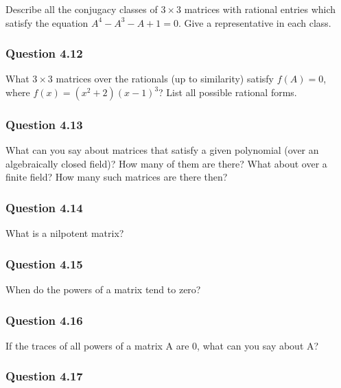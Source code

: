 Describe all the conjugacy classes of \(3 \times 3\) matrices with
rational entries which satisfy the equation \(A^4 - A^3 - A + 1 = 0\).
Give a representative in each class.

\hypertarget{question-4.12}{%
\subsubsection{Question 4.12}\label{question-4.12}}

What \(3 \times 3\) matrices over the rationals (up to similarity)
satisfy \(f (A) = 0\), where \(f (x) = (x^2 + 2)(x - 1)^3\)? List all
possible rational forms.

\hypertarget{question-4.13}{%
\subsubsection{Question 4.13}\label{question-4.13}}

What can you say about matrices that satisfy a given polynomial (over an
algebraically closed field)? How many of them are there? What about over
a finite field? How many such matrices are there then?

\hypertarget{question-4.14}{%
\subsubsection{Question 4.14}\label{question-4.14}}

What is a nilpotent matrix?

\hypertarget{question-4.15}{%
\subsubsection{Question 4.15}\label{question-4.15}}

When do the powers of a matrix tend to zero?

\hypertarget{question-4.16}{%
\subsubsection{Question 4.16}\label{question-4.16}}

If the traces of all powers of a matrix A are 0, what can you say about
A?

\hypertarget{question-4.17}{%
\subsubsection{Question 4.17}\label{question-4.17}}

